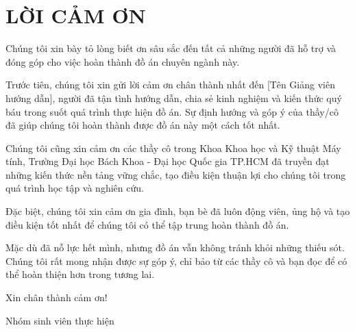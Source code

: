 \chapter*{LỜI CẢM ƠN}

Chúng tôi xin bày tỏ lòng biết ơn sâu sắc đến tất cả những người đã hỗ trợ và đóng góp cho việc hoàn thành đồ án chuyên ngành này.

Trước tiên, chúng tôi xin gửi lời cảm ơn chân thành nhất đến [Tên Giảng viên hướng dẫn], người đã tận tình hướng dẫn, chia sẻ kinh nghiệm và kiến thức quý báu trong suốt quá trình thực hiện đồ án. Sự định hướng và góp ý của thầy/cô đã giúp chúng tôi hoàn thành được đồ án này một cách tốt nhất.

Chúng tôi cũng xin cảm ơn các thầy cô trong Khoa Khoa học và Kỹ thuật Máy tính, Trường Đại học Bách Khoa - Đại học Quốc gia TP.HCM đã truyền đạt những kiến thức nền tảng vững chắc, tạo điều kiện thuận lợi cho chúng tôi trong quá trình học tập và nghiên cứu.

Đặc biệt, chúng tôi xin cảm ơn gia đình, bạn bè đã luôn động viên, ủng hộ và tạo điều kiện tốt nhất để chúng tôi có thể tập trung hoàn thành đồ án.

Mặc dù đã nỗ lực hết mình, nhưng đồ án vẫn không tránh khỏi những thiếu sót. Chúng tôi rất mong nhận được sự góp ý, chỉ bảo từ các thầy cô và bạn đọc để có thể hoàn thiện hơn trong tương lai.

Xin chân thành cảm ơn!

\begin{flushright}
Nhóm sinh viên thực hiện
\end{flushright}
